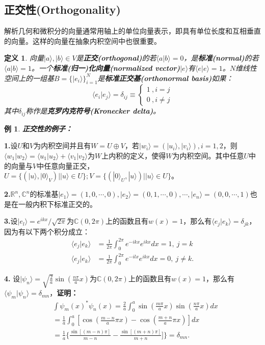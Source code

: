 \documentclass[mathserif,hyperref,UTF8,openany,b5paper]{ctexbook}
\newtheorem{exmp}{例}[section]
\newtheorem{defn}{定义}[section]
\begin{document}
\subsection{正交性(Orthogonality)}
解析几何和微积分的向量通常用轴上的单位向量表示，即具有单位长度和互相垂直的向量。这样的向量在抽象内积空间中也很重要。
\begin{defn}
向量$|a\rangle,|b\rangle\in V$是\textbf{正交(orthogonal)}的若$\langle a|b\rangle = 0$，是\textbf{标准(normal)}的若$\langle a|b\rangle = 1$。一个\textbf{标准(归一)化向量(normalized vector)}$|e\rangle$有$\langle e|e\rangle = 1$。$N$维线性空间上的一组基$B=\{|e_i\rangle\}^N_{i=1}$是\textbf{标准正交基(orthonormal basis)}如果：
\begin{equation}
    \langle e_i|e_j\rangle = \delta_{ij} \equiv \left\{\begin{array}{rcl}
    1 \ , i=j \\
    0 \ , i\neq j
    \end{array} \right.
\end{equation}
其中$\delta_{ij}$称作是\textbf{克罗内克符号(Kronecker delta)}。
\end{defn}
\begin{exmp}\textbf{正交性的例子：}\end{exmp}
\textbf{1.}设$U$和$V$为内积空间并且有$W=U\oplus V$，若$|w_i\rangle= (|u_i\rangle,|v_i\rangle),i=1,2$，则$\langle w_1|w_2\rangle=\langle u_1|u_2\rangle+\langle v_1|v_2\rangle$为$W$上内积的定义，使得$W$为内积空间。其中任意$U$中的向量与$V$中任意向量正交，$U=\{(|u\rangle,|0\rangle_V)||u\rangle \in U\};V=\{(|0\rangle_U,|u\rangle)||u\rangle \in U\}$。

\textbf{2.}$\mathbb{R}^n,\mathbb{C}^n$的标准基$|e_1\rangle = (1,0,\cdots,0),|e_2\rangle = (0,1,\cdots,0),\cdots,|e_n\rangle = (0,0,\cdots,1)$也是在一般内积下标准正交的。

\textbf{3.}设$|e_l\rangle=e^{ikx}/\sqrt{2\pi}$为$\mathbb{C}(0,2\pi)$上的函数且有$w(x)=1$，那么有$\langle e_j|e_k\rangle =\delta_{jk}$，因为有以下两个积分成立：
\begin{align}
    \langle e_j|e_k\rangle &= \frac{1}{2\pi}\int^{2\pi}_0 e^{-ikx}e^{ikx}dx=1, \ j=k\\
    \langle e_j|e_k\rangle &= \frac{1}{2\pi}\int^{2\pi}_0 e^{-ilx}e^{ikx}dx=0, \ j\neq k.
\end{align}

\textbf{4.} 设$|\psi_n\rangle=\sqrt{\frac{2}{a}}\sin (\frac{n\pi}{a}x)$为$\mathbb{C}(0,2\pi)$上的函数且有$w(x)=1$，那么有$\langle \psi_m|\psi_n\rangle =\delta_{mn}$，\textbf{证明：}
\begin{align}
    &\int\psi_m(x)^*\psi_n(x)=\frac{2}{a}\int^a_0\sin (\frac{m\pi}{a}x)\sin (\frac{n\pi}{a}x)dx\\
    &=\frac{1}{a}\int^a_0[\cos (\frac{m-n}{a}\pi x)-\cos (\frac{m+n}{a}\pi x)]dx\\
    &=\frac{1}{a}\{\frac{\sin[(m-n)\pi]}{m-n}-\frac{\sin[(m+n)\pi]}{m+n}]\}=\delta_{mn}.
\end{align}
\end{document}
